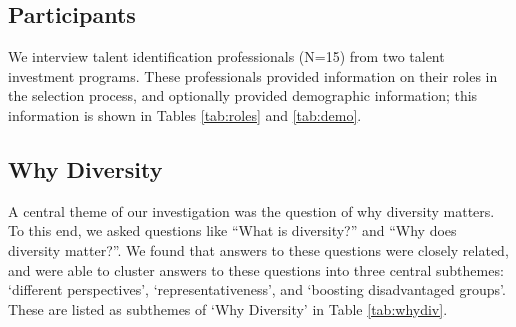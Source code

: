 

\subsection{Participants}
We interview talent identification professionals (N=15) from two talent investment programs. These professionals provided information on their roles in the selection process, and optionally provided demographic information; this information is shown in Tables \ref{tab:roles} and \ref{tab:demo}.

\begin{center}
    \label{tab:roles}
\end{center}

\begin{center}
    \label{tab:demo}
\end{center}


\subsection{Why Diversity}
A central theme of our investigation was the question of why diversity matters. To this end, we asked questions like ``What is diversity?'' and ``Why does diversity matter?''. We found that answers to these questions were closely related, and were able to cluster answers to these questions into three central subthemes: `different perspectives', `representativeness', and `boosting disadvantaged groups'. These are listed as subthemes of `Why Diversity' in Table \ref{tab:whydiv}.

